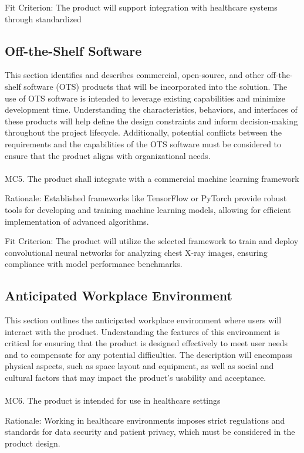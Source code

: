 \documentclass[12pt]{article}
\begin{document}
Fit Criterion: The product will support integration with healthcare systems through standardized

\subsection{Off-the-Shelf Software}
This section identifies and describes commercial, open-source, and other off-the-shelf software 
(OTS) products that will be incorporated into the solution. The use of OTS software is intended to 
leverage existing capabilities and minimize development time. Understanding the characteristics, 
behaviors, and interfaces of these products will help define the design constraints and inform 
decision-making throughout the project lifecycle. Additionally, potential conflicts between the 
requirements and the capabilities of the OTS software must be considered to ensure that the 
product aligns with organizational needs.
\\\\
\noindent
MC5. The product shall integrate with a commercial machine learning framework

Rationale: Established frameworks like TensorFlow or PyTorch provide robust tools for developing 
and training machine learning models, allowing for efficient implementation of advanced algorithms.

Fit Criterion: The product will utilize the selected framework to train and deploy convolutional 
neural networks for analyzing chest X-ray images, ensuring compliance with model performance 
benchmarks.


\subsection{Anticipated Workplace Environment}
This section outlines the anticipated workplace environment where users will interact with the 
product. Understanding the features of this environment is critical for ensuring that the product 
is designed effectively to meet user needs and to compensate for any potential difficulties. The 
description will encompass physical aspects, such as space layout and equipment, as well as social 
and cultural factors that may impact the product's usability and acceptance.
\\\\
\noindent
MC6. The product is intended for use in healthcare settings

Rationale: Working in healthcare environments imposes strict regulations and standards for data 
security and patient privacy, which must be considered in the product design.
\end{document}
